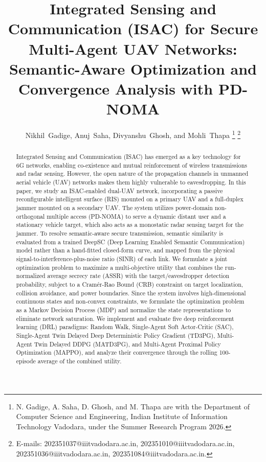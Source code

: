 \documentclass[journal,onecolumn]{IEEEtran}
\begin{document}
\title{Integrated Sensing and Communication (ISAC) for Secure Multi-Agent UAV Networks: Semantic-Aware Optimization and Convergence Analysis with PD-NOMA}

\author{
Nikhil~Gadige,
Anuj~Saha,
Divyanshu~Ghosh,
and Mohli~Thapa%
\thanks{N. Gadige, A. Saha, D. Ghosh, and M. Thapa are with the Department of Computer Science and Engineering, Indian Institute of Information Technology Vadodara, under the Summer Research Program 2026.}%
\thanks{E-mails: 202351037@iiitvadodara.ac.in, 202351010@iiitvadodara.ac.in, 202351036@iiitvadodara.ac.in, 202351084@iiitvadodara.ac.in.}
}

\maketitle

\begin{abstract}
Integrated Sensing and Communication (ISAC) has emerged as a key technology for 6G networks, enabling co-existence and mutual reinforcement of wireless transmissions and radar sensing. However, the open nature of the propagation channels in unmanned aerial vehicle (UAV) networks makes them highly vulnerable to eavesdropping. In this paper, we study an ISAC-enabled dual-UAV network, incorporating a passive reconfigurable intelligent surface (RIS) mounted on a primary UAV and a full-duplex jammer mounted on a secondary UAV. The system utilizes power-domain non-orthogonal multiple access (PD-NOMA) to serve a dynamic distant user and a stationary vehicle target, which also acts as a monostatic radar sensing target for the jammer. To resolve semantic-aware secure transmission, semantic similarity is evaluated from a trained DeepSC (Deep Learning Enabled Semantic Communication) model rather than a hand-fitted closed-form curve, and mapped from the physical signal-to-interference-plus-noise ratio (SINR) of each link. We formulate a joint optimization problem to maximize a multi-objective utility that combines the run-normalized average secrecy rate (ASSR) with the target/eavesdropper detection probability, subject to a Cram\'{e}r-Rao Bound (CRB) constraint on target localization, collision avoidance, and power boundaries. Since the system involves high-dimensional continuous states and non-convex constraints, we formulate the optimization problem as a Markov Decision Process (MDP) and normalize the state representations to eliminate network saturation. We implement and evaluate five deep reinforcement learning (DRL) paradigms: Random Walk, Single-Agent Soft Actor-Critic (SAC), Single-Agent Twin Delayed Deep Deterministic Policy Gradient (TD3PG), Multi-Agent Twin Delayed DDPG (MATD3PG), and Multi-Agent Proximal Policy Optimization (MAPPO), and analyze their convergence through the rolling 100-episode average of the combined utility.
\end{abstract}
\end{document}
